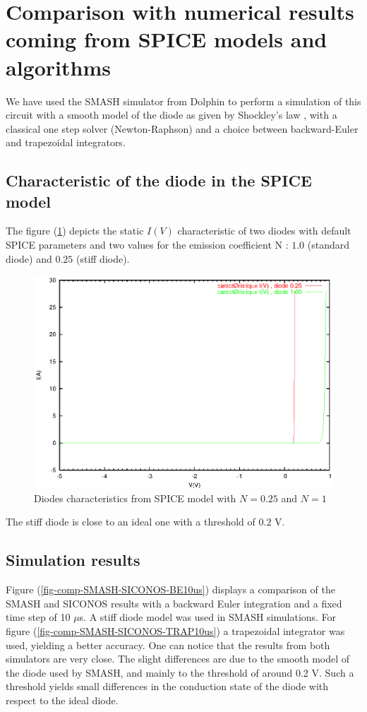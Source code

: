 \documentclass[10pt]{article}
\begin{document}
\section{Comparison with numerical results coming from SPICE models and algorithms}
We have used the SMASH simulator from Dolphin to perform a simulation of this circuit with a smooth model
of the diode as given by Shockley's law , with a classical one step solver (Newton-Raphson) and a choice between 
backward-Euler and trapezoidal integrators.

\subsection{Characteristic of the diode in the SPICE model}
The figure (\ref{fig-carac-diode}) depicts the static $I(V)$ characteristic of two diodes with default SPICE parameters
and two values for the emission coefficient N : $1.0$ (standard diode) and $0.25$ (stiff diode).

\begin{figure}[hbt]
\begin{center}
\includegraphics[width=12cm]{caracdiode.eps}
\end{center}
\caption{Diodes characteristics from SPICE model with $N=0.25$ and $N=1$}
\label{fig-carac-diode}
\end{figure}
 
The stiff diode is close to an ideal one with a threshold of $0.2$ V.

\subsection{Simulation results}
Figure (\ref{fig-comp-SMASH-SICONOS-BE10us}) displays a comparison of the SMASH and SICONOS results with
a backward Euler integration and a fixed time step of 10 $\mu$s. A stiff diode model was used in SMASH simulations.
For figure (\ref{fig-comp-SMASH-SICONOS-TRAP10us}) a trapezoidal integrator was used, yielding a better accuracy.
One can notice that the results from both simulators are very close. The slight differences are due to the smooth 
model of the diode used by SMASH, and mainly to the threshold of around 0.2 V. Such a threshold
yields small differences in the conduction state of the diode with respect to the ideal diode.
\end{document}
